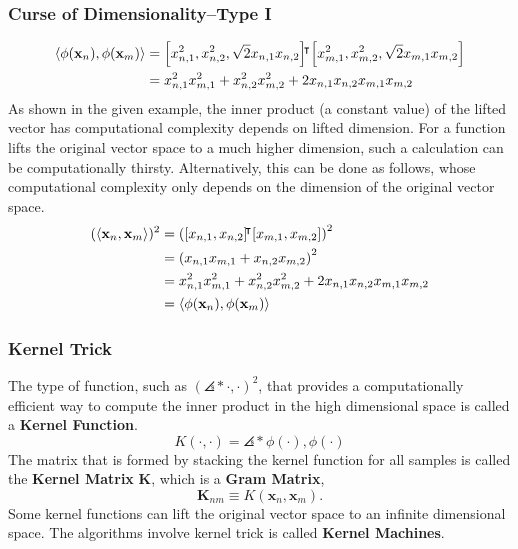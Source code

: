 \documentclass[10pt]{../formats/RU}
\begin{document}
\begin{frame}
\frametitle{Curse of Dimensionality--Type I}
  \begin{align*}
    \angles*{\phi(\mathbf{x}_n), \phi(\mathbf{x}_m)}
    &= \bracks*{x_{n,1}^2 , x_{n,2}^2 , \sqrt{2}x_{n,1}x_{n,2}}\trn\bracks*{x_{m,1}^2 , x_{m,2}^2 , \sqrt{2}x_{m,1}x_{m,2}} \\
    &= x_{n,1}^2x_{m,1}^2 + x_{n,2}^2x_{m,2}^2 + 2x_{n,1}x_{n,2}x_{m,1}x_{m,2}
  \end{align*}
As shown in the given example, the inner product (a constant value) of the lifted vector has computational complexity depends on lifted dimension. For a function lifts the original vector space to a much higher dimension, such a calculation can be computationally thirsty. Alternatively, this can be done as follows, whose computational complexity only depends on the dimension of the original vector space.
  \begin{align*}
    (\angles*{\mathbf{x}_n, \mathbf{x}_m})^2
    &= \parens*{\bracks*{x_{n,1} , x_{n,2}}\trn\bracks*{x_{m,1} , x_{m,2}}}^2 \\
    &= \parens*{x_{n,1}x_{m,1} + x_{n,2}x_{m,2}}^2 \\
    &= x_{n,1}^2x_{m,1}^2 + x_{n,2}^2x_{m,2}^2 + 2x_{n,1}x_{n,2}x_{m,1}x_{m,2} \\
    &= \angles*{\phi(\mathbf{x}_n), \phi(\mathbf{x}_m)}
  \end{align*}
\end{frame}
\begin{frame}
  \frametitle{Kernel Trick}
  The type of function, such as $(\angles*{\cdot, \cdot})^2$, that provides a computationally efficient way to compute the inner product in the high dimensional space is called a \textbf{Kernel Function}.
  \[
    K(\cdot,\cdot) = \angles*{\phi(\cdot),\phi(\cdot)}
  \]
  The matrix that is formed by stacking the kernel function for all samples is called the \textbf{Kernel Matrix} $\mathbf{K}$, which is a \textbf{Gram Matrix},
  \[
    \mathbf{K}_{nm} \equiv K(\mathbf{x}_n, \mathbf{x}_m).
  \]
  Some kernel functions can lift the original vector space to an infinite dimensional space.
  The algorithms involve kernel trick is called \textbf{Kernel Machines}.
\end{frame}
\end{document}
